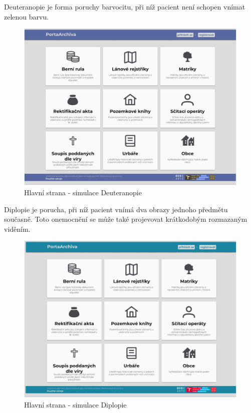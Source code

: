\newpage
\noindent
Deuteranopie je forma poruchy barvocitu, při níž pacient není schopen vnímat zelenou barvu.
\begin{figure}[htbp]
\centering
    \includegraphics[scale=.35]{obrazky-figures/testing/figma-eye-defects/Main - Deuteranopia.png}
    \caption{Hlavní strana - simulace Deuteranopie}
\end{figure}

\noindent
Diplopie je porucha, při níž pacient vnímá dva obrazy jednoho předmětu současně. Toto onemocnění se může také projevovat krátkodobým rozmazaným viděním.
\begin{figure}[htbp]
\centering
    \includegraphics[scale=.35]{obrazky-figures/testing/figma-eye-defects/Main - Ghosting.png}
    \caption{Hlavní strana - simulace Diplopie}
\end{figure}

